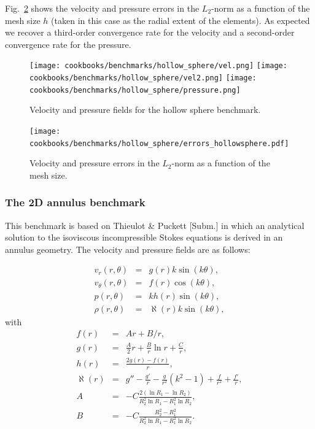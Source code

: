\documentclass{article}
\begin{document}
Fig.~\ref{fig:hollow-sphere-errors} shows the
velocity and pressure errors in the $L_2$-norm as a function of the mesh size $h$ (taken in this case
as the radial extent of the elements). As expected we recover a third-order convergence rate for the velocity
and a second-order convergence rate for the pressure.

\begin{figure}
\centering
\texttt{[image: cookbooks/benchmarks/hollow\_sphere/vel.png]}
\texttt{[image: cookbooks/benchmarks/hollow\_sphere/vel2.png]}
\texttt{[image: cookbooks/benchmarks/hollow\_sphere/pressure.png]}
\caption{Velocity and pressure fields for the hollow sphere benchmark.}
\label{fig:hollow-sphere-vp}
\end{figure}

\begin{figure}
\centering
\texttt{[image: cookbooks/benchmarks/hollow\_sphere/errors\_hollowsphere.pdf]}
\caption{Velocity and pressure errors in the $L_2$-norm as a function of the mesh size.}
\label{fig:hollow-sphere-errors}
\end{figure}


\subsubsection{The 2D annulus benchmark}
\label{sec:cookbooks-annulus}

This benchmark is based on Thieulot \& Puckett [Subm.] in which an analytical solution to the
isoviscous incompressible Stokes equations is derived in an annulus geometry.
The velocity and pressure fields are as follows:

\begin{eqnarray}
v_r(r,\theta)     &=&  g(r) k \sin(k\theta), \\
v_\theta(r,\theta)&=&  f(r) \cos(k \theta), \\ 
p(r,\theta)       &=&  k h(r) \sin(k \theta), \\
\rho (r,\theta)   &=& \aleph(r) k \sin (k \theta), 
\end{eqnarray}
with
\begin{eqnarray}
f(r)&=&Ar+B/r, \\
g(r) &=& \frac{A}{2}r  +  \frac{B}{r} \ln r + \frac{C}{r}, \\
h(r)&=& \frac{2g(r)-f(r)}{r},  \\
\aleph(r) &=& g'' - \frac{g'}{r}  - \frac{g}{r^2} (k^2 - 1)  + \frac{f}{r^2}   + \frac{f'}{r}, \\
A &=& -C\frac{2(\ln R_1 - \ln R_2)} { R_2^2 \ln R_1  - R_1^2 \ln R_2}, \\
B &=& -C \frac{R_2^2-R_1^2}{R_2^2 \ln R_1 - R_1^2 \ln R_2}.
\end{eqnarray}
\end{document}
